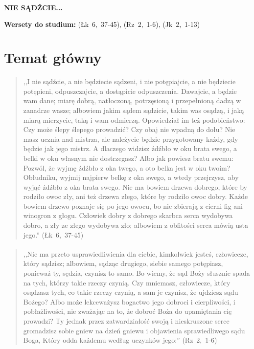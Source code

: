 \documentclass[10pt,a4paper,oneside]{article}
\begin{document}
\centerline{\textbf{\MakeUppercase{Nie sądźcie...}}}
\begin{center}
\textbf{Wersety do studium:} \mbox{(Łk 6, 37-45)}, \mbox{(Rz 2, 1-6)}, \mbox{(Jk 2, 1-13)}
\end{center}
\section{Temat główny}
\paragraph{}
\begin{quote}
,,I nie sądźcie, a nie będziecie sądzeni, i nie potępiajcie, a nie będziecie potępieni, odpuszczajcie, a dostąpicie odpuszczenia. Dawajcie, a będzie wam dane; miarę dobrą, natłoczoną, potrzęsioną i przepełnioną dadzą w zanadrze wasze; albowiem jakim sądem sądzicie, takim was osądzą, i jaką miarą mierzycie, taką i wam odmierzą. Opowiedział im też podobieństwo: Czy może ślepy ślepego prowadzić? Czy obaj nie wpadną do dołu? Nie masz ucznia nad mistrza, ale należycie będzie przygotowany każdy, gdy będzie jak jego mistrz. A dlaczego widzisz źdźbło w oku brata swego, a belki w oku własnym nie dostrzegasz? Albo jak powiesz bratu swemu: Pozwól, że wyjmę źdźbło z oka twego, a oto belka jest w oku twoim? Obłudniku, wyjmij najpierw belkę z oka swego, a wtedy przejrzysz, aby wyjąć źdźbło z oka brata swego. Nie ma bowiem drzewa dobrego, które by rodziło owoc zły, ani też drzewa złego, które by rodziło owoc dobry. Każde bowiem drzewo poznaje się po jego owocu, bo nie zbierają z cierni fig ani winogron z głogu. Człowiek dobry z dobrego skarbca serca wydobywa dobro, a zły ze złego wydobywa zło; albowiem z obfitości serca mówią usta jego.'' \mbox{(Łk 6, 37-45)}
\end{quote}
\paragraph{}
\begin{quote}
,,Nie ma przeto usprawiedliwienia dla ciebie, kimkolwiek jesteś, człowiecze, który sądzisz; albowiem, sądząc drugiego, siebie samego potępiasz, ponieważ ty, sędzia, czynisz to samo. Bo wiemy, że sąd Boży słusznie spada na tych, którzy takie rzeczy czynią. Czy mniemasz, człowiecze, który osądzasz tych, co takie rzeczy czynią, a sam je czynisz, że ujdziesz sądu Bożego? Albo może lekceważysz bogactwo jego dobroci i cierpliwości, i pobłażliwości, nie zważając na to, że dobroć Boża do upamiętania cię prowadzi? Ty jednak przez zatwardziałość swoją i nieskruszone serce gromadzisz sobie gniew na dzień gniewu i objawienia sprawiedliwego sądu Boga, Który odda każdemu według uczynków jego:'' \mbox{(Rz 2, 1-6)}
\end{quote}
\end{document}
